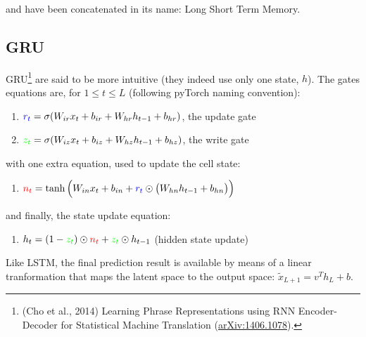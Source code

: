 \documentclass{article}
\begin{document}
and have been concatenated in its name: Long Short Term Memory.

\subsection{GRU}
GRU\footnote{(Cho et al., 2014) Learning Phrase Representations using RNN Encoder-Decoder for Statistical Machine Translation (\href{https://arxiv.org/abs/1406.1078}{arXiv:1406.1078}).} are said to be more intuitive (they indeed use only one state, $h$). The gates equations are, for $1\leq t \leq L$ (following pyTorch naming convention):
\begin{enumerate}[nosep]
  \item $\textcolor{blue}{r_t}=\sigma(W_{ir}x_t + b_{ir} + W_{hr} h_{t-1} + b_{hr})$, the update gate
  \item $\textcolor{green}{z_t}=\sigma(W_{iz} x_t + b_{iz} + W_{hz} h_{t-1} + b_{hz})$, the write gate
\end{enumerate}

with one extra equation, used to update the cell state:
\begin{enumerate}
  \item $\textcolor{red}{n_t}=\tanh\Big(W_{in} x_t + b_{in} + \textcolor{blue}{r_t} \odot \big( W_{hn} h_{t-1} + b_{hn}\big)\Big) $
\end{enumerate}
\medskip

and finally, the state update equation:
\begin{enumerate}
  \item $h_t = (1 - \textcolor{green}{z_t}) \odot \textcolor{red}{n_t} + \textcolor{green}{z_t} \odot h_{t-1}$ (hidden state update)
\end{enumerate}
\medskip

Like LSTM, the final prediction result is available by means of a linear tranformation that maps the latent space to the output space: $\widetilde{x}_{L+1} = v^T h_L + b$.
\end{document}
